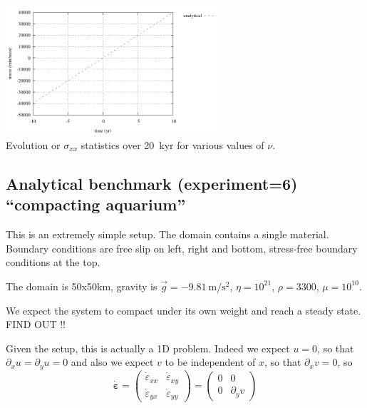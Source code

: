 \begin{center}
\includegraphics[width=8cm]{python_codes/fieldstone_129/results/experiment7/stats_stress}\\
{\captionfont Evolution or $\sigma_{xx}$ statistics over 20~kyr for various values of $\nu$.}
\end{center} 



\newpage
\subsection*{Analytical benchmark (experiment=6) ``compacting aquarium''}

This is an extremely simple setup. The domain contains a single material. 
Boundary conditions are free slip on left, right and bottom, stress-free boundary conditions 
at the top. 

The domain is 50x50km, gravity is $\vec{g}=-9.81~\si{\meter\per\square\second}$, 
$\eta=10^{21}$, $\rho=3300$, $\mu=10^{10}$.

We expect the system to compact under its own weight and reach a 
steady state. FIND OUT !!

Given the setup, this is actually a 1D problem. Indeed we expect $u=0$, so that
$\partial_x u = \partial_y u =0$ and also we expect $v$ to be independent of $x$, 
so that $\partial_x v=0$, so
\[
\dot{\bm\varepsilon}
=\left( 
\begin{array}{cc}
\dot\varepsilon_{xx} & \dot\varepsilon_{xy} \\
\dot\varepsilon_{yx} & \dot\varepsilon_{yy} 
\end{array}
\right)
=
\left( 
\begin{array}{cc}
0 & 0 \\
0 & \partial_y v
\end{array}
\right)
\]




\newpage

